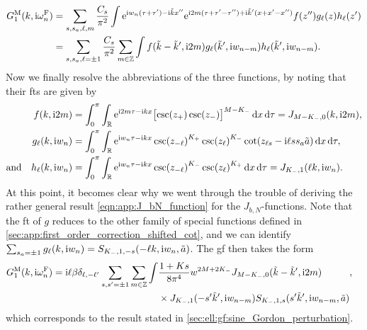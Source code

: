 \begin{align*}
G^\M_1(k,\i\omega_n^\F) &=  \sum_{s,s_a,\ell,m} \frac{C_s}{\pi^2}\int \powe{\i w_n (\tau + \tau') - \i \tilde{k} x''} \powe{\i 2m (\tau + \tau' - \tau'') + \i \tilde{k}' (x+x'-x'')} f(z'') g_\ell(z) h_\ell(z')\\
&= \sum_{s,s_a,\ell=\pm 1} \frac{C_s}{\pi^2} \sum_{m\in\mathbb{Z}} \int f(\tilde{k}- \tilde{k}', \i 2m) g_\ell(\tilde{k}', \i w_{n-m}) h_\ell(\tilde{k}', \i w_{n-m}).
\end{align*}
Now we finally resolve the abbreviations of the three functions, by noting that their \glspl{ft} are given by
\begin{align*}
f(k,\i 2m) &= \intx{0}{\pi}{ \intr{\powe{\i 2m\tau - \i kx} \klb[\big]{\csc(z_+) \csc(z_-)} ^{M-K_-}}{x} }{\tau} = J_{M-K_-,0}(k,\i 2m),\\
g_\ell(k,\i w_n) &= \intx{0}{\pi}{\intr{\powe{\i w_n\tau - \i kx} \csc(z_{-\ell})^{K_+} \csc(z_{\ell})^{K_-} \cot(z_{\ell s} - \i\ell ss_a\tilde{a}) }{x} }{\tau},\\
\text{and}\quad h_\ell(k,\i w_n) &= \intx{0}{\pi}{\intr{\powe{\i w_n\tau - \i kx} \csc(z_{-\ell})^{K_-} \csc(z_{\ell})^{K_+} }{x} }{\tau} = J_{K_-,1}(\ell k, \i w_n).
\end{align*}
At this point, it becomes clear why we went through the trouble of deriving the rather general result \autoref{eqn:app:J_bN_function} for the $J_{b,N}$-functions.
Note that the \gls{ft} of $g$ reduces to the other family of special functions defined in \autoref{sec:app:first_order_correction_shifted_cot}, and we can identify $\sum_{s_a=\pm 1} g_\ell(k,\i w_n) = S_{K_-,1,-s}(-\ell k, \i w_n, \tilde{a})$.
The \gls{gf} then takes the form
\begin{align*}
G^\M_1(k,\i\omega_n^\F) &= \bsplit{\i\ell \beta \delta_{\ell,-\ell'} \sum_{s,s'=\pm 1} \sum_{m\in\mathbb{Z}} \int & \frac{1+Ks}{8\pi^4} w^{2M+2K_-} J_{M-K_-,0}(\tilde{k} - \tilde{k}',\i 2m)\\
&\times J_{K_-,1}(-s' \tilde{k}', \i w_{n-m}) S_{K_-,1,s}(s' \tilde{k}', \i w_{n-m}, \tilde{a})},
\end{align*}
which corresponds to the result stated in \autoref{sec:ell:gf:sine_Gordon_perturbation}.\newpage
